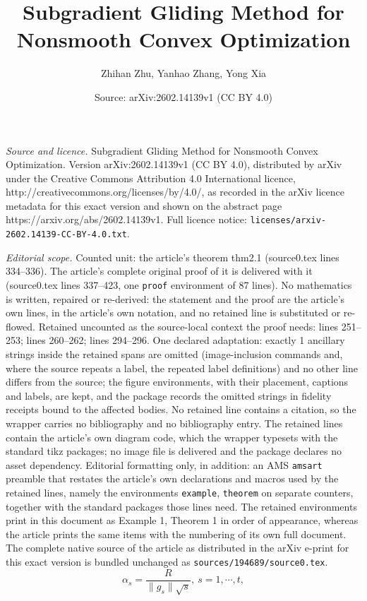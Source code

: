 \documentclass[10pt,a4paper]{amsart}
\title{\vspace{-12mm} Subgradient Gliding Method for Nonsmooth Convex Optimization}
\author{Zhihan Zhu, Yanhao Zhang, Yong Xia}
\date{Source: arXiv:2602.14139v1 (CC BY 4.0)}
\begin{document}
\maketitle

\noindent\emph{Source and licence.} \vspace{-12mm} Subgradient Gliding Method for Nonsmooth Convex Optimization. Version arXiv:2602.14139v1 (CC BY 4.0), distributed by arXiv under the Creative Commons Attribution 4.0 International licence, http://creativecommons.org/licenses/by/4.0/, as recorded in the arXiv licence metadata for this exact version and shown on the abstract page https://arxiv.org/abs/2602.14139v1. Full licence notice: \texttt{licenses/arxiv-2602.14139-CC-BY-4.0.txt}.\par\smallskip

\noindent\textit{Editorial scope.} Counted unit: the article's theorem thm2.1 (source0.tex lines 334--336). The article's complete original proof of it is delivered with it (source0.tex lines 337--423, one \texttt{proof} environment of 87 lines). No mathematics is written, repaired or re-derived: the statement and the proof are the article's own lines, in the article's own notation, and no retained line is substituted or re-flowed.  Retained uncounted as the source-local context the proof needs: lines 251--253; lines 260--262; lines 294--296.  One declared adaptation: exactly 1 ancillary strings inside the retained spans are omitted (image-inclusion commands and, where the source repeats a label, the repeated label definitions) and no other line differs from the source; the figure environments, with their placement, captions and labels, are kept, and the package records the omitted strings in fidelity receipts bound to the affected bodies.  No retained line contains a citation, so the wrapper carries no bibliography and no bibliography entry.  The retained lines contain the article's own diagram code, which the wrapper typesets with the standard tikz packages; no image file is delivered and the package declares no asset dependency.  Editorial formatting only, in addition: an AMS \texttt{amsart} preamble that restates the article's own declarations and macros used by the retained lines, namely the environments \texttt{example}, \texttt{theorem} on separate counters, together with the standard packages those lines need.  The retained environments print in this document as Example 1, Theorem 1 in order of appearance, whereas the article prints the same items with the numbering of its own full document.  The complete native source of the article as distributed in the arXiv e-print for this exact version is bundled unchanged as \texttt{sources/194689/source0.tex}.
\begin{equation}
	\alpha_s=\frac{R}{\|g_s\|\sqrt{s}},~s=1,\cdots,t, \label{Nesterov}
\end{equation}
\end{document}
